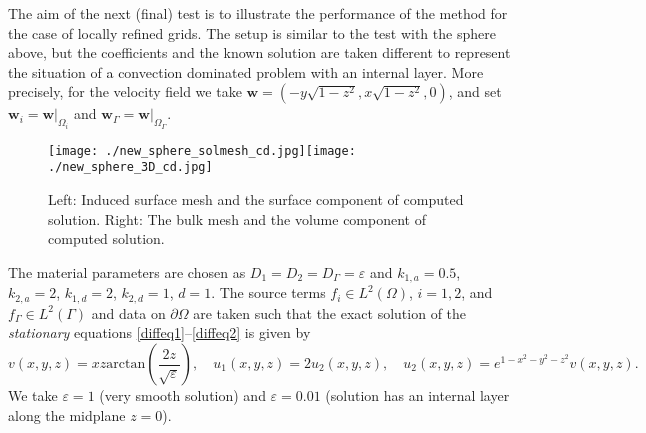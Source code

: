 \documentclass{article}
\newcommand{\rev}[1]{\textcolor{black}{{#1}}}
\let\eps\varepsilon
\newcommand{\bw}{\mathbf w}
\def\dO{{\partial\Omega} }
\begin{document}
{The aim of the next (final) test is to illustrate the performance of the method for the case of locally refined grids.  The setup is similar to the test with the sphere above, but the coefficients and the known solution are taken different to represent the situation of \rev{a} convection dominated problem with an internal layer. More precisely,  for the velocity field we take  $\bw=(-y\sqrt{1-z^2},x\sqrt{1-z^2},0)$, and set $\bw_i=\bw|_{\Omega_i}$ and $\bw_\Gamma=\bw|_{\Omega_\Gamma}$.

\begin{figure}[ht!]
\begin{center}
\texttt{[image: ./new\_sphere\_solmesh\_cd.jpg]}\qquad  \texttt{[image: ./new\_sphere\_3D\_cd.jpg]}
\caption{\label{fig:sphere_adap}
Left: Induced surface mesh and the surface component of computed solution.
Right: The bulk mesh and the volume component of computed solution.}
\end{center}
\end{figure}

The material parameters are chosen as $D_1=D_2=D_\Gamma=\eps$ and $k_{1,a}=0.5$, $k_{2,a}=2$, $k_{1,d}=2$, $k_{2,d}=1$, $d=1$.
The source terms $f_i\in L^2(\Omega)$, $i=1,2$, and $f_\Gamma\in L^2(\Gamma)$   and  data on $\dO$ are taken such  that the exact solution of the  \textit{stationary} equations \eqref{diffeq1}--\eqref{diffeq2} is given by
\begin{equation*} %
  v(x,y,z) = {x z}\mathrm{arctan}\left(\frac{2z}{\sqrt{\varepsilon}}\right), \quad
  u_1(x,y,z) = 2 u_2(x,y,z), \quad
  u_2(x,y,z) = e^{1-x^2-y^2-z^2} v(x,y,z).
\end{equation*}
We take $\eps=1$ (very smooth solution) and $\eps=0.01$ (solution has an internal layer along the midplane $z=0$).


}
\end{document}
